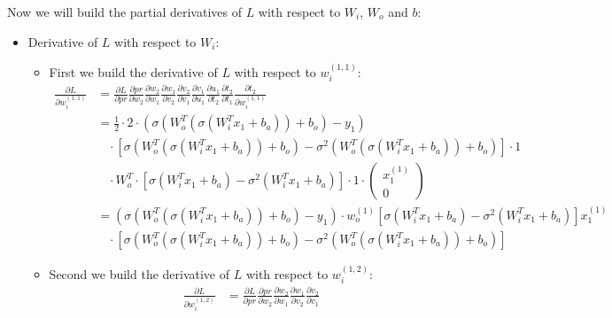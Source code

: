 \documentclass[a4paper]{article}
\begin{document}
        Now we will build the partial derivatives of $L$ with respect to $W_i$, $W_o$ and $b$:
        \begin{itemize}
            \item Derivative of $L$ with respect to $W_i$:
                \begin{itemize}
                    \item First we build the derivative of $L$ with respect to $w_i^{(1,1)}$:
                        \begin{align*}
                            \frac{\partial L}{\partial w_i^{(1,1)}} &= \frac{\partial L}{\partial pr} \frac{\partial pr}{\partial w_2} 
                            \frac{\partial w_2}{\partial w_1} \frac{\partial w_1}{\partial v_2} \frac{\partial v_2}{\partial v_1}
                            \frac{\partial v_1}{\partial u_1} \frac{\partial u_1}{\partial t_2} \frac{\partial t_2}{\partial t_1} \frac{\partial t_2}{\partial w_i^{(1,1)}}\\
                            &= \frac{1}{2} \cdot 2 \cdot (\sigma(W_o^T(\sigma(W_i^T x_1 + b_a)) + b_o) - y_1)\\
                            &\ \ \ \ \cdot [\sigma(W_o^T(\sigma(W_i^T x_1 + b_a)) + b_o) - \sigma^2(W_o^T(\sigma(W_i^T x_1 + b_a)) + b_o)] \cdot 1\\
                            &\ \ \ \ \cdot W_o^T \cdot [\sigma(W_i^T x_1 + b_a) - \sigma^2(W_i^T x_1 + b_a)] \cdot 1 
                            \cdot \left( \begin{matrix} x_1^{(1)} \\ 0 \end{matrix} \right)\\
                            &= (\sigma(W_o^T(\sigma(W_i^T x_1 + b_a)) + b_o) - y_1) \cdot w_o^{(1)} [\sigma(W_i^T x_1 + b_a) - \sigma^2(W_i^T x_1 + b_a)] x_1^{(1)}\\
                            &\ \ \ \ \cdot [\sigma(W_o^T(\sigma(W_i^T x_1 + b_a)) + b_o) - \sigma^2(W_o^T(\sigma(W_i^T x_1 + b_a)) + b_o)]
                        \end{align*}
                    \item Second we build the derivative of $L$ with respect to $w_i^{(1,2)}$:
                        \begin{align*}
                            \frac{\partial L}{\partial w_i^{(1,2)}} &= \frac{\partial L}{\partial pr} \frac{\partial pr}{\partial w_2} 
                            \frac{\partial w_2}{\partial w_1} \frac{\partial w_1}{\partial v_2} \frac{\partial v_2}{\partial v_1}

\end{align*}
\end{itemize}
\end{itemize}
\end{document}
